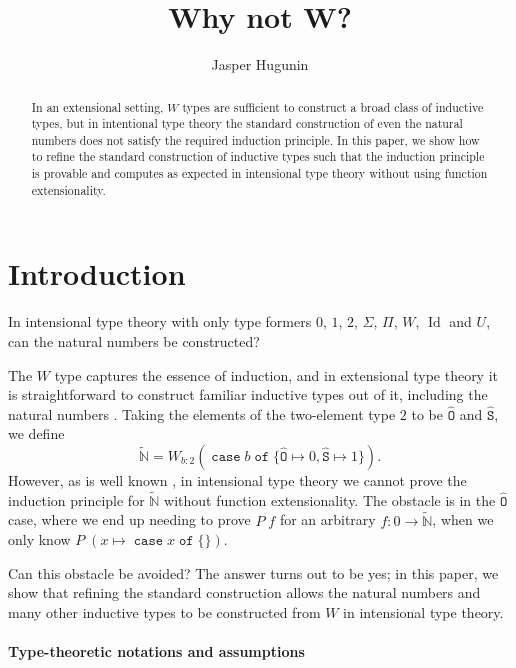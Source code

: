 \documentclass[a4paper,UKenglish,cleveref,nameinlink,autoref,thm-restate]{lipics-v2019}
\title{Why not W?}
\author{Jasper Hugunin}{Carnegie Mellon University, Pittsburgh PA, USA}{jasper@hugunin.net}{https://orcid.org/0000-0002-1133-5354}{}
\newcommand{\zero}{0}
\newcommand{\one}{1}
\newcommand{\bool}{2}
\newcommand{\codeO}{\mathtt{\hat{O}}}
\newcommand{\codeS}{\mathtt{\hat{S}}}
\newcommand{\preN}{\hyperref[define-preN]{\tilde{\mathbb{N}}}}
\DeclareMathOperator{\case}{\mathtt{case}}
\newcommand{\caset}[2]{\case {#1}\;\mathtt{of}\;\{{#2}\}}
\DeclareMathOperator{\Idop}{\mathrm{Id}}
\begin{document}
\maketitle

\begin{abstract}
In an extensional setting, $W$ types are sufficient to construct a broad class of inductive types, but in intentional type theory the standard construction of even the natural numbers does not satisfy the required induction principle. In this paper, we show how to refine the standard construction of inductive types such that the induction principle is provable and computes as expected in intensional type theory without using function extensionality.
\end{abstract}

\section{Introduction}

In intensional type theory with only type formers $\zero$, $\one$, $\bool$, $\Sigma$, $\Pi$, $W$, $\Idop$ and $U$, can the natural numbers be constructed?

The $W$ type \cite{mltt} captures the essence of induction, and in extensional type theory it is straightforward to construct familiar inductive types out of it, including the natural numbers \cite{dybjer-W-encodes-inductive}.
Taking the elements of the two-element type $\bool$ to be $\codeO$ and $\codeS$, we define \begin{equation}\label{define-preN}\preN = W_{b : \bool} (\caset{b}{\codeO \mapsto \zero, \codeS \mapsto \one}).\end{equation}
However, as is well known \cite{dybjer-W-encodes-inductive,luo-wellordering,mcbride_wtypes,programming-in-MLTT}, in intensional type theory we cannot prove the induction principle for $\preN$ without function extensionality. The obstacle is in the $\codeO$ case, where we end up needing to prove $P\;f$ for an arbitrary $f : \zero \to \preN$, when we only know $P\;(x\mapsto\caset{x}{})$.

Can this obstacle be avoided?
The answer turns out to be yes; in this paper, we show that refining the standard construction allows the natural numbers and many other inductive types to be constructed from $W$ in intensional type theory.

\paragraph*{Type-theoretic notations and assumptions}
\end{document}
